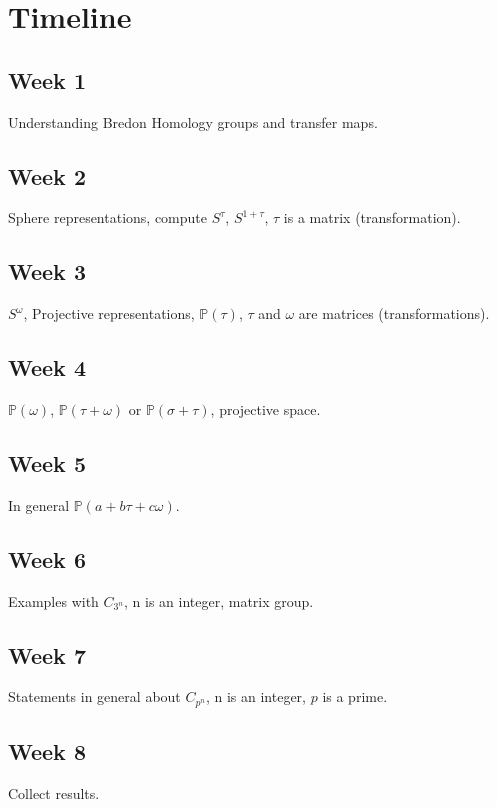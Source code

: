 \documentclass[12pt]{article}
\begin{document}
\section{Timeline}
\subsection{Week 1}
Understanding Bredon Homology groups and transfer maps.

\subsection{Week 2}
Sphere representations, compute $S^{\tau}$, $S^{1+\tau}$, $\tau$ is a matrix (transformation).

\subsection{Week 3}
$S^{\omega}$, Projective representations, $\mathbb{P}(\tau)$, $\tau$ and $\omega$ are matrices (transformations).

\subsection{Week 4}
$\mathbb{P}(\omega)$, $\mathbb{P}(\tau + \omega)$ or $\mathbb{P}(\sigma + \tau)$, projective space.

\subsection{Week 5}
In general $\mathbb{P}(a + b\tau + c\omega)$.

\subsection{Week 6}
Examples with $C_{3^n}$, n is an integer, matrix group.

\subsection{Week 7}
Statements in general about $C_{p^n}$, n is an integer, $p$ is a prime.

\subsection{Week 8}
Collect results.



\end{document}
